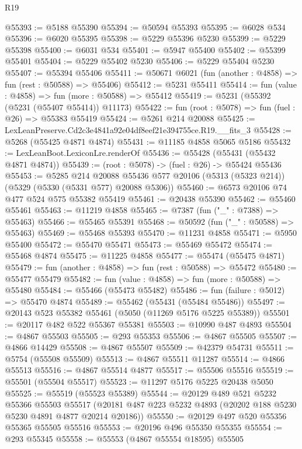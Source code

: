 \begin{lexlean}{R19}
\begin{coremodule}
@55393 := @5188 @55390
@55394 := @50594 @55393
@55395 := @6028 @534
@55396 := @6020 @55395
@55398 := @5229 @55396 @5230
@55399 := @5229 @55398
@55400 := @6031 @534
@55401 := @5947 @55400
@55402 := @55399 @55401
@55404 := @5229 @55402 @5230
@55406 := @5229 @55404 @5230
@55407 := @55394 @55406
@55411 := @50671 @6021 (fun (another : @4858) => fun (rest : @50588) => @55406)
@55412 := @5231 @55411
@55414 := fun (value : @4858) => fun (more : @50588) => @55412
@55419 := @5231 (@55392 (@5231 (@55407 @55414)) @11173)
@55422 := fun (root : @5078) => fun (fuel : @26) => @55383 @55419
@55424 := @5261 @214 @20088
@55425 := LexLeanPreserve.Cd2c3e4841a92e04df8eef21e394755ce.R19.__fits_3
@55428 := @5268 (@55425 @4871 @4874)
@55431 := @11185 @4858 @5065 @5186
@55432 := LexLeanBoot.LexiconLre.renderOf
@55436 := @55428 (@55431 (@55432 @4871 @4874))
@55439 := (root : @5078) -> (fuel : @26) -> @55424 @55436
@55453 := @5285
    @214
    @20088
    @55436
    @577
    @20106
    (@5313 (@5323 @214))
    (@5329 (@5330 (@5331 @577) @20088 @5306))
@55460 := @6573 @20106 @74 @477 @524 @575 @55382 @55419
@55461 := @20438 @55390
@55462 := @55460 @55461
@55463 := @11219 @4858
@55465 := @7387 (fun ("_" : @7388) => @55463)
@55466 := @55465 @55391
@55468 := @50592 (fun ("_" : @50588) => @55463)
@55469 := @55468 @55393
@55470 := @11231 @4858
@55471 := @5950 @55400
@55472 := @55470 @55471
@55473 := @55469 @55472
@55474 := @55468 @4874
@55475 := @11225 @4858
@55477 := @55474 (@55475 @4871)
@55479 := fun (another : @4858) => fun (rest : @50588) => @55472
@55480 := @55477 @55479
@55482 := fun (value : @4858) => fun (more : @50588) => @55480
@55484 := @55466 (@55473 @55482)
@55486 := fun (failure : @5012) => @55470 @4874
@55489 := @55462 (@55431 (@55484 @55486))
@55497 := @20143 @523 @55382 @55461 (@5050 (@11269 @5176 @5225 @55389))
@55501 := @20117 @482 @522 @55367 @55381
@55503 := @10990 @487 @4893
@55504 := @4867 @55503
@55505 := @293 @55353
@55506 := @4867 @55505
@55507 := @4866 @14429
@55508 := @4867 @55507
@55509 := @42379 @54731
@55511 := @5754 (@55508 @55509)
@55513 := @4867 @55511 @11287
@55514 := @4866 @55513
@55516 := @4867 @55514 @4877
@55517 := @55506 @55516
@55519 := @55501 (@55504 @55517)
@55523 := @11297 @5176 @5225 @20438 @5050
@55525 := @55519 (@55523 @55389)
@55544 := @20129
    @489
    @521
    @5232
    @55366
    @55503
    @55517
    (@20181 @487 @223 @5232 @4893 (@20202 @188 @5230 @5230 @4891 @4877 @20214 @20186))
@55550 := @20129 @497 @520 @55356 @55365 @55505 @55516
@55553 := @20196 @496 @55350 @55355
@55554 := @293 @55345
@55558 := @55553 (@4867 @55554 @18595) @55505

\end{coremodule}
\end{lexlean}
